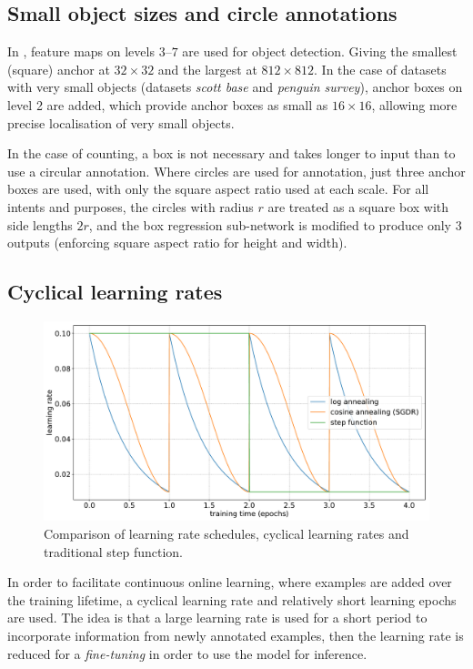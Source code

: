 \subsection{Small object sizes and circle annotations}
\label{sec:small_object}

In \cite{Lin2017}, feature maps on levels $3$--$7$ are used for object detection. Giving the smallest (square) anchor at $32\times32$ and the largest at $812\times812$. In the case of datasets with very small objects (datasets \emph{scott base} and \emph{penguin survey}), anchor boxes on level 2 are added, which provide anchor boxes as small as $16 \times 16$, allowing more precise localisation of very small objects.

In the case of counting, a box is not necessary and takes longer to input than to use a circular annotation. Where circles are used for annotation, just three anchor boxes are used, with only the square aspect ratio used at each scale. For all intents and purposes, the circles with radius $r$ are treated as a square box with side lengths $2r$, and the box regression sub-network is modified to produce only $3$ outputs (enforcing square aspect ratio for height and width).


\subsection {Cyclical learning rates}
\label{sec:schedule}

\begin{figure}[htb]
  \centering
  \includegraphics[width=1.0\linewidth]{charts/training/lr_schedules.pdf}
  \caption{Comparison of learning rate schedules, cyclical learning rates and traditional step function.  }  
  \label{fig:lr_schedule}
\end{figure}

In order to facilitate continuous online learning, where examples are added over the training lifetime, a cyclical learning rate and relatively short learning epochs are used. The idea is that a large learning rate is used for a short period to incorporate information from newly annotated examples, then the learning rate is reduced for a \emph{fine-tuning} in order to use the model for inference.


